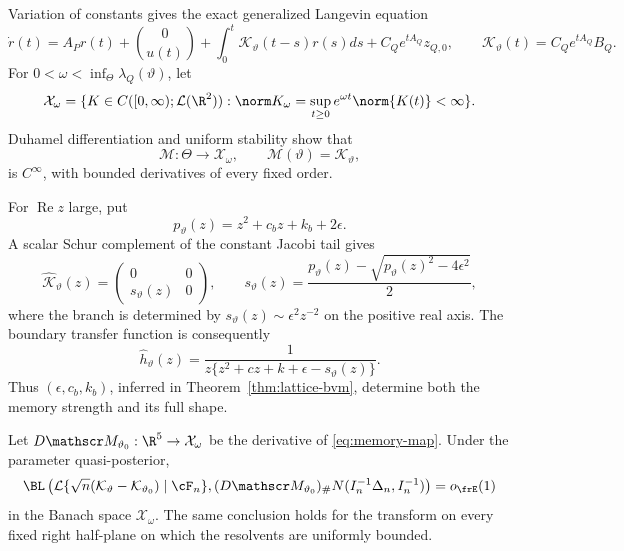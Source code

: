Variation of constants gives the exact generalized Langevin equation
\begin{equation}
 \dot r(t)=A_Pr(t)+\binom0{u(t)}
 +\int_0^t\mathcal K_\vartheta(t-s)r(s)ds
 +C_Qe^{tA_Q}z_{Q,0},
 \qquad
 \mathcal K_\vartheta(t)=C_Qe^{tA_Q}B_Q.
 \label{eq:gle}
\end{equation}
For \(0<\omega<\inf_\Theta\lambda_Q(\vartheta)\), let
\[
 \mathcal X_\omega=\{K\in C([0,\infty);\mathcal L(\R^2)):
 \norm K_\omega=\sup_{t\ge0}e^{\omega t}\norm{K(t)}<\infty\}.
\]
Duhamel differentiation and uniform stability show that
\begin{equation}
 \mathscr M:\Theta\to\mathcal X_\omega,\qquad
 \mathscr M(\vartheta)=\mathcal K_\vartheta,
 \label{eq:memory-map}
\end{equation}
is \(C^\infty\), with bounded derivatives of every fixed order.

For \(\operatorname{Re}z\) large, put
\[
 p_\vartheta(z)=z^2+c_bz+k_b+2\epsilon.
\]
A scalar Schur complement of the constant Jacobi tail gives
\begin{equation}
 \widehat{\mathcal K}_\vartheta(z)=
 \begin{pmatrix}0&0\\s_\vartheta(z)&0\end{pmatrix},
 \qquad
 s_\vartheta(z)=
 \frac{p_\vartheta(z)-
 \sqrt{p_\vartheta(z)^2-4\epsilon^2}}2,
 \label{eq:memory-transform}
\end{equation}
where the branch is determined by
\(s_\vartheta(z)\sim\epsilon^2z^{-2}\) on the positive real axis.  The
boundary transfer function is consequently
\begin{equation}
 \widehat h_\vartheta(z)=
 \frac1{z\{z^2+cz+k+\epsilon-s_\vartheta(z)\}}.
 \label{eq:boundary-transfer}
\end{equation}
Thus \((\epsilon,c_b,k_b)\), inferred in
Theorem~\ref{thm:lattice-bvm}, determine both the memory strength and its full
shape.

\begin{corollary}
\label{cor:memory-posterior}
Let \(D\mathscr M_{\vartheta_0}:\R^5\to\mathcal X_\omega\) be the derivative
of \eqref{eq:memory-map}.  Under the parameter quasi-posterior,
\begin{equation}
 \BL\left(
 \mathcal L\{\sqrt n(\mathcal K_\vartheta-
 \mathcal K_{\vartheta_0})\mid\cF_n\},
 (D\mathscr M_{\vartheta_0})_\#
 N(I_n^{-1}\Delta_n,I_n^{-1})
 \right)=o_{\frE}(1)
 \label{eq:memory-posterior}
\end{equation}
in the Banach space \(\mathcal X_\omega\).  The same conclusion holds for
the transform on every fixed right half-plane on which the resolvents are
uniformly bounded.
\end{corollary}

